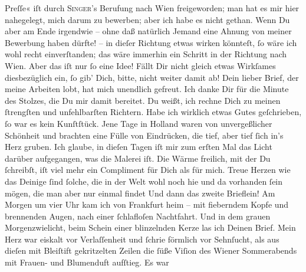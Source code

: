                   Preſſe« iſt durch \textsc{Singer}’s Berufung nach {\pb}Wien freigeworden; man hat es mir hier nahegelegt,
               mich darum zu bewerben; aber ich habe es nicht gethan. Wenn Du aber am Ende irgendwie
               – ohne daß natürlich Jemand eine Ahnung von meiner Bewerbung haben dürfte! – in
               dieſer Richtung etwas wirken könnteſt,{ }ſo wäre ich wohl recht einverſtanden; das wäre
               immerhin ein Schritt in der Richtung nach Wien.
               Aber das iſt nur{ }ſo eine Idee! Fällt Dir nicht gleich etwas Wirkſames
                  diesbezüglich\strikeout{\textcolor{gray}{er}} ein,{ }ſo gib’ Dich, bitte, nicht weiter damit ab! {\dotsfour}
               Dein lieber Brief, der meine Arbeiten lobt, hat mich unendlich gefreut. Ich danke Dir
               für die Minute des Stolzes, die Du mir damit bereitet. Du weißt, ich rechne Dich zu
               meinen{ }ſtrengſten und unfehlbarſten Richtern. Habe ich wirklich etwas Gutes
               geſchrieben,{ }ſo war es kein Kunſtſtück. Jene Tage in Holland waren von unvergeßlicher Schönheit und brachten eine Fülle von
               Eindrücken, die tief,  aber tief{ }ſich in’s Herz gruben. Ich glaube, in
               dieſen Tagen iſt mir zum erſten Mal das Licht darüber aufgegangen, was die Malerei
               iſt. Die Wärme freilich, mit der Du{ }ſchreibſt, iſt \strikeout{\textcolor{gray}{fie}} viel mehr {\pb}ein Compliment für Dich als für
               mich. Treue Herzen wie das Deinige{ }ſind{ }ſolche, die in der Welt wohl noch hie und da
               vorhanden{ }ſein mögen, die man aber nur einmal findet{\dotsfour} Und
               dann das zweite Brieflein! Am Morgen um vier Uhr kam ich  von Frankfurt
               heim – mit fieberndem Kopfe und brennenden Augen, nach einer{ }ſchlafloſen Nachtfahrt.
               Und in dem grauen Morgenzwielicht, beim Schein einer blinzelnden Kerze las ich Deinen
               Brief. Mein Herz war eiskalt vor Verlaſſenheit und{ }ſchrie förmlich vor Sehnſucht, als
               aus dieſen mit Bleiſtift gekritzelten Zeilen die{ }ſüße Viſion des Wiener Sommerabends mit Frauen- und Blumenduft aufſtieg. Es war
